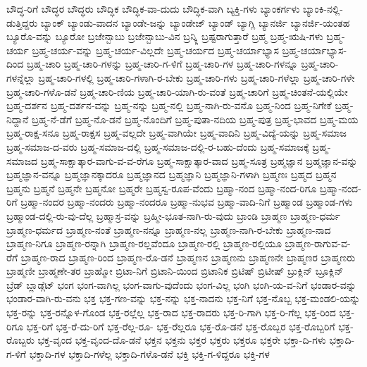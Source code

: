 {ಬೌದ್ಧ-ರಿಗೆ
ಬೌದ್ಧರ
ಬೌದ್ಧರು
ಬೌದ್ಧಿಕ
ಬೌದ್ಧಿಕ-ವಾ-ದುದು
ಬೌದ್ಧಿಕ-ವಾಗಿ
ಬ್ಯಕ್ತಿ-ಗಳು
ಬ್ಯಾಂಕರ್ಗಳು
ಬ್ಯಾಂಕಿ-ನಲ್ಲಿ-ಡುತ್ತಿದ್ದರು
ಬ್ಯಾಂಕ್
ಬ್ಯಾಂಡು-ವಾದನ
ಬ್ಯಾಂಡೇ-ಜನ್ನು
ಬ್ಯಾಂಡೇಜ್
ಬ್ಯಾಂಡ್
ಬ್ಯಾಗ್ಲಿ
ಬ್ಯಾನರ್ಜಿ
ಬ್ಯಾನರ್ಜಿ-ಯಂತಹ
ಬ್ಯೂರೊ-ವನ್ನು
ಬ್ಯೂರೋ
ಬ್ರಜೇನ್ಬಾಬು
ಬ್ರಜೇನ್ಬಾಬು-ವಿನ
ಬ್ರನ್ಕ್ಲಿ
ಬ್ರಷ್ಟರಾಗುತ್ತಾರೆ
ಬ್ರಹ್ಮ
ಬ್ರಹ್ಮ-ಋಷಿ-ಗಳು
ಬ್ರಹ್ಮ-ಚರ್ಯ
ಬ್ರಹ್ಮ-ಚರ್ಯ-ವನ್ನು
ಬ್ರಹ್ಮ-ಚರ್ಯ-ವಿಲ್ಲದೇ
ಬ್ರಹ್ಮ-ಚರ್ಯದ
ಬ್ರಹ್ಮ-ಚರ್ಯಾಭ್ಯಾಸ
ಬ್ರಹ್ಮ-ಚರ್ಯಾಭ್ಯಾಸ-ದಿಂದ
ಬ್ರಹ್ಮ-ಚಾರಿ
ಬ್ರಹ್ಮ-ಚಾರಿ-ಗಳನ್ನು
ಬ್ರಹ್ಮ-ಚಾರಿ-ಗ-ಳಿಗೆ
ಬ್ರಹ್ಮ-ಚಾರಿ-ಗಳ
ಬ್ರಹ್ಮ-ಚಾರಿ-ಗಳನ್ನೂ
ಬ್ರಹ್ಮ-ಚಾರಿ-ಗಳನ್ನೆಲ್ಲಾ
ಬ್ರಹ್ಮ-ಚಾರಿ-ಗಳಲ್ಲಿ
ಬ್ರಹ್ಮ-ಚಾರಿ-ಗಳಾಗಿ-ರ-ಬೇಕು
ಬ್ರಹ್ಮ-ಚಾರಿ-ಗಳು
ಬ್ರಹ್ಮ-ಚಾರಿ-ಗಳೆಲ್ಲಾ
ಬ್ರಹ್ಮ-ಚಾರಿ-ಗಳೇ
ಬ್ರಹ್ಮ-ಚಾರಿ-ಗಳೊ-ಡನೆ
ಬ್ರಹ್ಮ-ಚಾರಿ-ಣಿಯ
ಬ್ರಹ್ಮ-ಚಾರಿ-ಯಾಗಿ-ರು-ವಂತೆ
ಬ್ರಹ್ಮ-ಚಾರಿಗೆ
ಬ್ರಹ್ಮ-ಚಿಂತನೆ-ಯಲ್ಲಿಯೇ
ಬ್ರಹ್ಮ-ದರ್ಶನ
ಬ್ರಹ್ಮ-ದರ್ಶನ-ವನ್ನು
ಬ್ರಹ್ಮ-ನನ್ನು
ಬ್ರಹ್ಮ-ನಲ್ಲಿ
ಬ್ರಹ್ಮ-ನಾಗಿ-ರು-ವನೊ
ಬ್ರಹ್ಮ-ನಿಂದ
ಬ್ರಹ್ಮ-ನಿಗೇಕೆ
ಬ್ರಹ್ಮ-ನಿದ್ದಾನೆ
ಬ್ರಹ್ಮ-ನೆ-ಡೆಗೆ
ಬ್ರಹ್ಮ-ನೊ-ಡನೆ
ಬ್ರಹ್ಮ-ನೊಂದಿಗೆ
ಬ್ರಹ್ಮ-ಪುತಾ-ನದಿಯ
ಬ್ರಹ್ಮ-ಪುತ್ರ
ಬ್ರಹ್ಮ-ಭಾವದ
ಬ್ರಹ್ಮ-ಮಯ
ಬ್ರಹ್ಮ-ರಾಕ್ಷ-ಸನೂ
ಬ್ರಹ್ಮ-ರಾಕ್ಷಸ
ಬ್ರಹ್ಮ-ವಲ್ಲದೇ
ಬ್ರಹ್ಮ-ವಾಗಿಯೇ
ಬ್ರಹ್ಮ-ವಾದಿನಿ
ಬ್ರಹ್ಮ-ವಿದ್ಯೆ-ಯನ್ನು
ಬ್ರಹ್ಮ-ಸಮಾಜ
ಬ್ರಹ್ಮ-ಸಮಾಜ-ದ-ವರು
ಬ್ರಹ್ಮ-ಸಮಾಜ-ದಲ್ಲಿ
ಬ್ರಹ್ಮ-ಸಮಾಜ-ದಲ್ಲಿ-ರ-ಬಹು-ದೆಂದು
ಬ್ರಹ್ಮ-ಸಮಾಜಕ್ಕೆ
ಬ್ರಹ್ಮ-ಸಮಾಜದ
ಬ್ರಹ್ಮ-ಸಾಕ್ಷಾತ್ಕಾರ-ವಾಗು-ವ-ವ-ರೆಗೂ
ಬ್ರಹ್ಮ-ಸಾಕ್ಷಾತ್ಕಾರ-ವಾದ
ಬ್ರಹ್ಮ-ಸೂತ್ರ
ಬ್ರಹ್ಮಜ್ಞಾನ
ಬ್ರಹ್ಮಜ್ಞಾನ-ವನ್ನು
ಬ್ರಹ್ಮಜ್ಞಾನ-ವನ್ನೂ
ಬ್ರಹ್ಮಜ್ಞಾನಕ್ಕಾದರೂ
ಬ್ರಹ್ಮಜ್ಞಾನದ
ಬ್ರಹ್ಮಜ್ಞಾನಿ
ಬ್ರಹ್ಮಜ್ಞಾನಿ-ಗಳಾಗಿ
ಬ್ರಹ್ಮಣಃ
ಬ್ರಹ್ಮದ
ಬ್ರಹ್ಮನ
ಬ್ರಹ್ಮನು
ಬ್ರಹ್ಮನೆ
ಬ್ರಹ್ಮನೇ
ಬ್ರಹ್ಮನೋ
ಬ್ರಹ್ಮರೇ
ಬ್ರಹ್ಮಸ್ವ-ರೂಪ-ವೆಂದು
ಬ್ರಹ್ಮಾ-ನಂದ
ಬ್ರಹ್ಮಾ-ನಂದ-ರಿಗೂ
ಬ್ರಹ್ಮಾ-ನಂದ-ರಿಗೆ
ಬ್ರಹ್ಮಾ-ನಂದರ
ಬ್ರಹ್ಮಾ-ನಂದರು
ಬ್ರಹ್ಮಾ-ನಂದರೂ
ಬ್ರಹ್ಮಾ-ನುಭವ
ಬ್ರಹ್ಮಾ-ವಾದಿ-ನಿಗೆ
ಬ್ರಹ್ಮಾಂಡ
ಬ್ರಹ್ಮಾಂಡ-ಗಳು
ಬ್ರಹ್ಮಾಂಡ-ದಲ್ಲಿ-ರು-ವು-ದೆಲ್ಲ
ಬ್ರಹ್ಮಾಸ್ರ-ವನ್ನು
ಬ್ರಹ್ಮೀ-ಭೂತ-ನಾಗಿ-ರು-ವುದು
ಬ್ರಾಂಡಿ
ಬ್ರಾಹ್ಮಣ
ಬ್ರಾಹ್ಮಣ-ಧರ್ಮ
ಬ್ರಾಹ್ಮಣ-ಧರ್ಮದ
ಬ್ರಾಹ್ಮಣ-ನಂತೆ
ಬ್ರಾಹ್ಮಣ-ನನ್ನೂ
ಬ್ರಾಹ್ಮಣ-ನಲ್ಲ
ಬ್ರಾಹ್ಮಣ-ನಾಗಿ-ರ-ಬೇಕು
ಬ್ರಾಹ್ಮಣ-ನಾದ
ಬ್ರಾಹ್ಮಣ-ನಿಗೂ
ಬ್ರಾಹ್ಮಣ-ರನ್ನಾಗಿ
ಬ್ರಾಹ್ಮಣ-ರಲ್ಲವೆಂದೂ
ಬ್ರಾಹ್ಮಣ-ರಲ್ಲಿ
ಬ್ರಾಹ್ಮಣ-ರಲ್ಲಿಯೂ
ಬ್ರಾಹ್ಮಣ-ರಾಗುವ-ವ-ರೆಗೆ
ಬ್ರಾಹ್ಮಣ-ರಾದ
ಬ್ರಾಹ್ಮಣ-ರಿಂದ
ಬ್ರಾಹ್ಮಣ-ರೊ-ಡನೆ
ಬ್ರಾಹ್ಮಣನ
ಬ್ರಾಹ್ಮಣನು
ಬ್ರಾಹ್ಮಣನೇ
ಬ್ರಾಹ್ಮಣರ
ಬ್ರಾಹ್ಮಣರು
ಬ್ರಾಹ್ಮಣೀ
ಬ್ರಾಹ್ಮಣೇ-ತರ
ಬ್ರಾಹ್ಮೋ
ಬ್ರಿಟಾ-ನಿಗೆ
ಬ್ರಿಟಾನಿ-ಯಿಂದ
ಬ್ರಿಟಾನಿಕ
ಬ್ರಿಟಿಷ್
ಬ್ರಿಟೀಷ್
ಬ್ರುಕ್ಲಿನ್
ಬ್ರೂಕ್ಲಿನ್
ಬ್ರೆಡ್
ಬ್ಲಾಡ್ಗೆಟ್
ಭಂಗ
ಭಂಗ-ವಾಗಿಲ್ಲ
ಭಂಗ-ವಾಗು-ವುದೆಂದು
ಭಂಗ-ವಿಲ್ಲ
ಭಂಗಿ
ಭಂಗಿ-ಯ-ವ-ನಿಗೆ
ಭಂಡಾರ-ವನ್ನು
ಭಂಡಾರ-ವಾಗಿ-ರು-ವನು
ಭಕ್ತ
ಭಕ್ತ-ಗಣ-ವನ್ನು
ಭಕ್ತ-ನನ್ನು
ಭಕ್ತ-ನಾದನು
ಭಕ್ತ-ನಿಗೆ
ಭಕ್ತ-ನೊಬ್ಬ
ಭಕ್ತ-ಮಂಡಲಿ-ಯನ್ನು
ಭಕ್ತ-ರನ್ನು
ಭಕ್ತ-ರನ್ನೊಳ-ಗೊಂಡ
ಭಕ್ತ-ರಲ್ಲೆಲ್ಲ
ಭಕ್ತ-ರಾದ
ಭಕ್ತ-ರಾದರು
ಭಕ್ತ-ರಿ-ಗಾಗಿ
ಭಕ್ತ-ರಿ-ಗೆಲ್ಲ
ಭಕ್ತ-ರಿಂದ
ಭಕ್ತ-ರಿಗೂ
ಭಕ್ತ-ರಿಗೆ
ಭಕ್ತ-ರೆ-ದು-ರಿಗೆ
ಭಕ್ತ-ರೆಲ್ಲ-ರೂ-
ಭಕ್ತ-ರೆಲ್ಲರೂ
ಭಕ್ತ-ರೊ-ಡನೆ
ಭಕ್ತ-ರೊಬ್ಬರ
ಭಕ್ತ-ರೊಬ್ಬರಿಗೆ
ಭಕ್ತ-ರೊಬ್ಬರು
ಭಕ್ತ-ವೃಂದ
ಭಕ್ತ-ವೃಂದ-ದೊ-ಡನೆ
ಭಕ್ತನ
ಭಕ್ತನು
ಭಕ್ತರ
ಭಕ್ತರು
ಭಕ್ತರೂ
ಭಕ್ತರೇ
ಭಕ್ತಾ-ದಿ-ಗಳು
ಭಕ್ತಾದಿ-ಗ-ಳಿಗೆ
ಭಕ್ತಾದಿ-ಗಳ
ಭಕ್ತಾದಿ-ಗಳೆಲ್ಲ
ಭಕ್ತಾದಿ-ಗಳೊ-ಡನೆ
ಭಕ್ತಿ
ಭಕ್ತಿ-ಗ-ಳಿದ್ದರೂ
ಭಕ್ತಿ-ಗಳ
}
